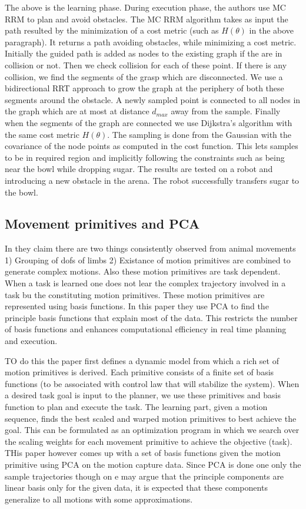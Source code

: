 \documentclass{article}[11pt]
\begin{document}
The above is the learning phase. During execution phase, the authors use MC RRM to plan and avoid obstacles. The MC RRM algorithm takes as input the path resulted by the minimization of a cost metric (such as $H(\theta)$ in the above paragraph). It returns a path avoiding obstacles, while minimizing a cost metric. Initially the guided path is added as nodes to the existing graph if the are in collision or not. Then we check collision for each of these point. If there is any collision, we find the segments of the grasp which are disconnected. We use a bidirectional RRT approach to grow the graph at the periphery of both these segments around the obstacle. A newly sampled point is connected to all nodes in the graph which are at most at distance $d_{max}$ away from the sample. Finally when the segments of the graph are connected we use Dijkstra's algorithm with the same cost metric $H(\theta)$. The sampling is done from the Gaussian with the covariance of the node points as computed in the cost function. This lets samples to be in required region and implicitly following the constraints such as being near the bowl while dropping sugar. The results are tested on a robot and introducing a new obstacle in the arena. The robot successfully transfers sugar to the bowl. 

\subsection{Movement primitives and PCA}
In \cite{lim2005movement} they claim there are two things consistently observed from animal movements 1) Grouping of dofs of limbs 2) Existance of motion primitives are combined to generate complex motions. Also these motion primitives are task dependent. When a task is learned one does not lear the complex trajectory involved in a task bu the constituting motion primitives. These motion primitives are represented using basis functions. In this paper they use PCA to find the principle basis functions that explain most of the data. This restricts the number of basis functions and enhances computational efficiency in real time planning and execution. 

TO do this the paper first defines a dynamic model from which a rich set of motion primitives is derived. Each primitive consists of a finite set of basis functions (to be associated with control law that will stabilize the system). When a desired task goal is input to the planner, we use these primitives and basis function to plan and execute the task. The learning part, given a motion sequence, finds the best scaled and warped motion primitives to best achieve the goal. This can be formulated as an optimization program in which we search over the scaling weights for each movement primitive to achieve the objective (task). THis paper however comes up with a set of basis functions given the motion primitive using PCA on the motion capture data. Since PCA is done one only the sample trajectories though on e may argue that the principle components are linear basis only for the given data, it is expected that these components generalize to all motions with some approximations. 
\end{document}
